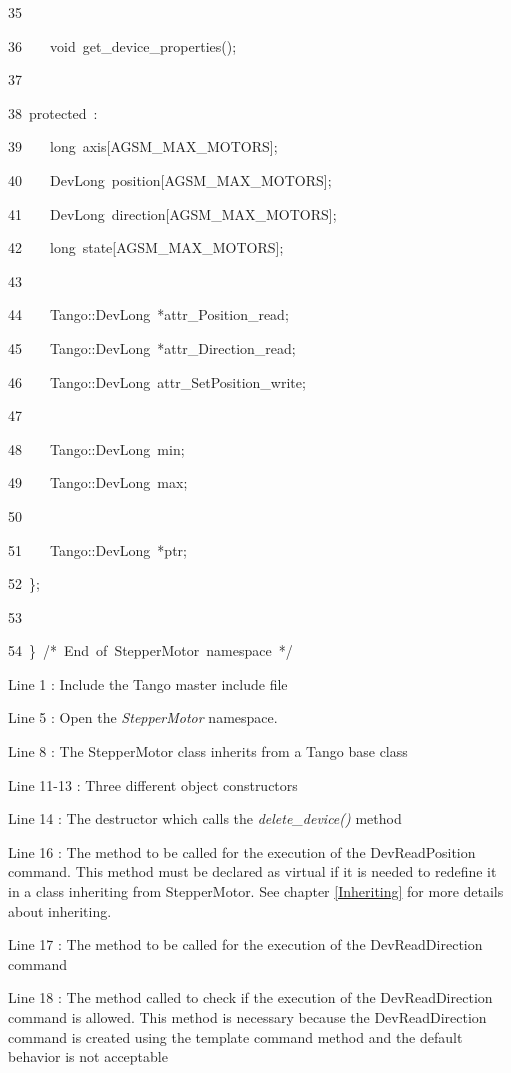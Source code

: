 \begin{lyxcode}
35~

36~~~~void~get\_device\_properties();

37~

38~protected~:~

39~~~~long~axis{[}AGSM\_MAX\_MOTORS{]};

40~~~~DevLong~position{[}AGSM\_MAX\_MOTORS{]};

41~~~~DevLong~direction{[}AGSM\_MAX\_MOTORS{]};

42~~~~long~state{[}AGSM\_MAX\_MOTORS{]};

43~

44~~~~Tango::DevLong~{*}attr\_Position\_read;

45~~~~Tango::DevLong~{*}attr\_Direction\_read;

46~~~~Tango::DevLong~attr\_SetPosition\_write;

47~

48~~~~Tango::DevLong~min;

49~~~~Tango::DevLong~max;

50~

51~~~~Tango::DevLong~{*}ptr;

52~\};

53~

54~\}~/{*}~End~of~StepperMotor~namespace~{*}/
\end{lyxcode}



Line 1 : Include the Tango master include file

Line 5 : Open the \emph{StepperMotor} namespace.

Line 8 : The StepperMotor class inherits from a Tango base class

Line 11-13 : Three different object constructors

Line 14 : The destructor which calls the \emph{delete\_device()} method

Line 16 : The method to be called for the execution of the DevReadPosition
command. This method must be declared as virtual if it is needed to
redefine it in a class inheriting from StepperMotor. See chapter \ref{Inheriting}
for more details about inheriting.

Line 17 : The method to be called for the execution of the DevReadDirection
command

Line 18 : The method called to check if the execution of the DevReadDirection
command is allowed. This method is necessary because the DevReadDirection
command is created using the template command method and the default
behavior is not acceptable

